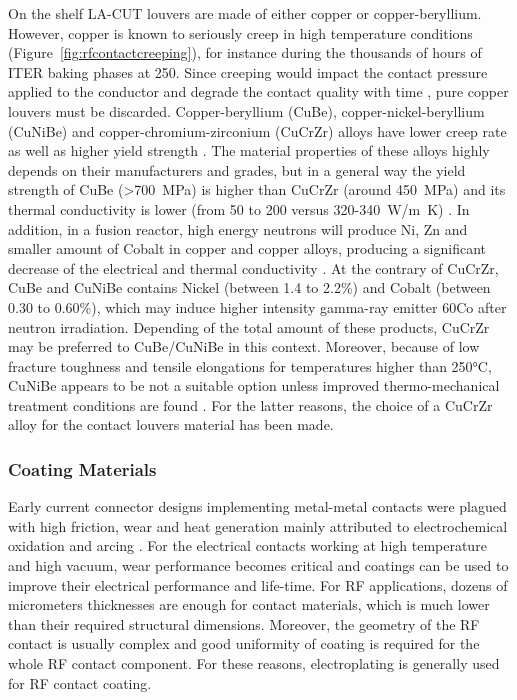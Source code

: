 {On the shelf LA-CUT louvers are made of either copper or copper-beryllium. However, copper is known to seriously creep in high temperature conditions (Figure~\ref{fig:rfcontactcreeping}), for instance during the thousands of hours of ITER baking phases at 250\degC. Since creeping would impact the contact pressure applied to the conductor and degrade the contact quality with time , pure copper louvers must be discarded. Copper-beryllium (CuBe), copper-nickel-beryllium (CuNiBe) and copper-chromium-zirconium (CuCrZr) alloys have lower creep rate as well as higher yield strength . The material properties of these alloys highly depends on their manufacturers and grades, but in a general way the yield strength of CuBe (>700~MPa) is higher than CuCrZr (around 450~MPa) and its thermal conductivity is lower (from 50 to 200 versus 320-340~\si{W/m.K}) . In addition, in a fusion reactor, high energy neutrons will produce Ni, Zn and smaller amount of Cobalt in copper and copper alloys, producing a significant decrease of the electrical and thermal conductivity  . At the contrary of CuCrZr, CuBe and CuNiBe contains Nickel (between 1.4 to 2.2\%) and Cobalt (between 0.30 to 0.60\%), which may induce higher intensity gamma-ray emitter 60Co after neutron irradiation. Depending of the total amount of these products, CuCrZr may be preferred to CuBe/CuNiBe in this context. Moreover, because of low fracture toughness and tensile elongations for temperatures higher than 250$\si{\degreeCelsius}$, CuNiBe appears to be not a suitable option unless improved thermo-mechanical treatment conditions are found . For the latter reasons, the choice of a CuCrZr alloy for the contact louvers material has been made.

\subsubsection{Coating Materials}
Early current connector designs implementing metal-metal contacts were plagued with high friction, wear and heat generation mainly attributed to electrochemical oxidation and arcing . For the electrical contacts working at high temperature and high vacuum, wear performance becomes critical and coatings can be used to improve their electrical performance and life-time. For RF applications, dozens of micrometers thicknesses are enough for contact materials, which is much lower than their required structural dimensions. Moreover, the geometry of the RF contact is usually complex and good uniformity of coating is required for the whole RF contact component. For these reasons, electroplating is generally used for RF contact coating.  

}
